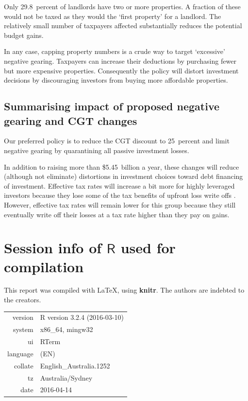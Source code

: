 \documentclass{grattan}\usepackage[]{graphicx}\usepackage[]{color}
\begin{document}
Only 29.8~percent of landlords have two or more properties.  A fraction of these would not be taxed as they would the `first property' for a landlord. The relatively small number of taxpayers affected substantially reduces the potential budget gains. 

In any case, capping property numbers is a crude way to target `excessive' negative gearing. Taxpayers can increase their deductions by purchasing fewer but more expensive properties. Consequently the policy will distort investment decisions by discouraging investors from buying more affordable properties. 

\section{Summarising impact of proposed negative gearing and CGT changes}
Our preferred policy is to reduce the CGT discount to 25~percent and limit negative gearing by quarantining all passive investment losses. 

In addition to raising more than \$5.45~billion a year, these changes will reduce (although not eliminate) distortions in investment choices toward debt financing of investment. Effective tax rates will increase a bit more for highly leveraged investors because they lose some of the tax benefits of upfront loss write offs . However, effective tax rates will remain lower for this group because they still eventually write off their losses at a tax rate higher than they pay on gains. 


\printbibliography[title=References]

\onecolumn
\appendix
\chapter{Session info of $\mathsf{R}$ used for compilation}
This report was compiled with \textrm{\LaTeX}, using \textbf{knitr}. The authors are indebted to the creators.


\begin{table}[!htb]
\centering
\begin{tabular}{rl}
  \toprule
 version & R version 3.2.4 (2016-03-10) \\ 
  system & x86\_64, mingw32 \\ 
  ui & RTerm \\ 
  language & (EN) \\ 
  collate & English\_Australia.1252 \\ 
  tz & Australia/Sydney \\ 
  date & 2016-04-14 \\ 
   \bottomrule
\end{tabular}

\end{table}
\end{document}
